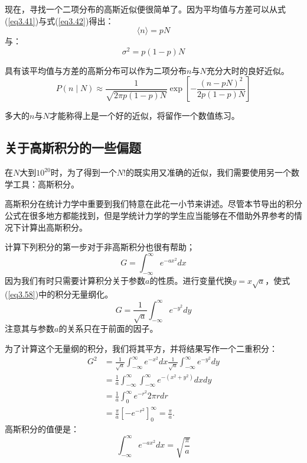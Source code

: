 \documentclass[UTF8]{ctexart}
\numberwithin{equation}{section}%
\numberwithin{figure}{section}%
\begin{document}
    现在，寻找一个二项分布的高斯近似便很简单了。因为平均值与方差可以从式(\ref{eq3.41})与式(\ref{eq3.42})得出：
    \begin{equation}
        \langle{n}\rangle=pN
    \end{equation}
    与：
    \begin{equation}
        \sigma^2=p(1-p)N
    \end{equation}

    具有该平均值与方差的高斯分布可以作为二项分布$n$与$N$充分大时的良好近似。
    \begin{equation}\label{eq3.57}
    P(n \mid N) \approx \frac{1}{\sqrt{2 \pi p(1-p) N}} \exp \left[-\frac{(n-p N)^{2}}{2 p(1-p) N}\right]
    \end{equation}

    多大的$n$与$N$才能称得上是一个好的近似，将留作一个数值练习。

    \subsection{关于高斯积分的一些偏题}\label{sec3.10}
    在$N$大到$10^{20}$时，为了得到一个$N!$的既实用又准确的近似，我们需要使用另一个数学工具：高斯积分。

    高斯积分在统计力学中重要到我们特意在此花一小节来讲述。尽管本节导出的积分公式在很多地方都能找到，但是学统计力学的学生应当能够在不借助外界参考的情况下计算出高斯积分。

    计算下列积分的第一步对于非高斯积分也很有帮助；
    \begin{equation}\label{eq3.58}
        G=\int_{-\infty}^{\infty} e^{-a x^{2}} dx
    \end{equation}
    因为我们有时只需要计算积分关于参数$a$的性质。进行变量代换$y=x\sqrt{a}$，使式(\ref{eq3.58})中的积分无量纲化。
    \begin{equation}
        G=\frac{1}{\sqrt{a}} \int_{-\infty}^{\infty} e^{-y^{2}} dy
    \end{equation}
    注意其与参数$a$的关系只在于前面的因子。

    为了计算这个无量纲的积分，我们将其平方，并将结果写作一个二重积分：
    \begin{equation}
        \begin{aligned}
            G^{2} &=\frac{1}{\sqrt{a}} \int_{-\infty}^{\infty} e^{-x^{2}} d x \frac{1}{\sqrt{a}} \int_{-\infty}^{\infty} e^{-y^{2}} d y \\
            &=\frac{1}{a} \int_{-\infty}^{\infty} \int_{-\infty}^{\infty} e^{-\left(x^{2}+y^{2}\right)} d x d y \\
            &=\frac{1}{a} \int_{0}^{\infty} e^{-r^{2}} 2 \pi r d r \\
            &=\frac{\pi}{a}\left[-e^{-r^{2}}\right]_{0}^{\infty}=\frac{\pi}{a} .
            \end{aligned}
    \end{equation}
    高斯积分的值便是：
    \begin{equation}\label{eq3.61}
        \int_{-\infty}^{\infty} e^{-a x^{2}} d x=\sqrt{\frac{\pi}{a}}
    \end{equation}
\end{document}
